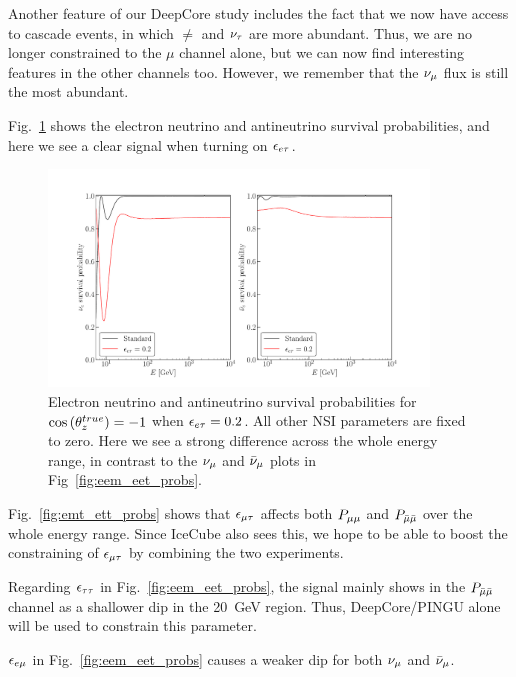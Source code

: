 Another feature of our DeepCore study includes the fact that we now have access to cascade events, in which $\ne$ and $\nu_\tau$ are more abundant.
Thus, we are no longer constrained to the $\mu$ channel alone, but we can now find interesting features in the other channels too. However, we 
remember that the $\nu_\mu$ flux is still the most abundant.

Fig.~\ref{fig:Pee_eet_probs} shows the electron neutrino and antineutrino survival probabilities, and here we see
a clear signal when turning on $\epsilon_{e\tau}$. 

\begin{figure}
    \begin{center}
        \includegraphics[width=0.9\textwidth]{figures/Pee_eet_probs.pdf}
        \caption{Electron neutrino and antineutrino survival probabilities for
        $\cos{(\theta_z^{true})} = -1$ when $\epsilon_{e\tau} = 0.2$. All other NSI parameters are fixed to zero. Here we see a strong difference across the whole energy range, in contrast to the $\nu_\mu$ and $\bar{\nu}_\mu$ plots in Fig~\ref{fig:eem_eet_probs}.}
        \label{fig:Pee_eet_probs}
    \end{center}
\end{figure}

Fig.~\ref{fig:emt_ett_probs} shows that $\epsilon_{\mu\tau}$ affects both $P_{\mu\mu}$ and $P_{\bar{\mu} \bar{\mu}}$ over the whole energy range. Since 
IceCube also sees this, we hope to be able to boost the constraining of $\epsilon_{\mu\tau}$ by combining the two experiments.

Regarding $\epsilon_{\tau\tau}$ in Fig.~\ref{fig:eem_eet_probs}, the signal mainly shows in the $P_{\bar{\mu} \bar{\mu}}$ channel as
a shallower dip in the \SI{20}{\GeV} region. Thus, DeepCore/PINGU alone will be used to constrain this parameter.

$\epsilon_{e\mu}$ in Fig.~\ref{fig:eem_eet_probs} causes a weaker dip for both $\nu_\mu$ and $\bar{\nu}_\mu$. 


